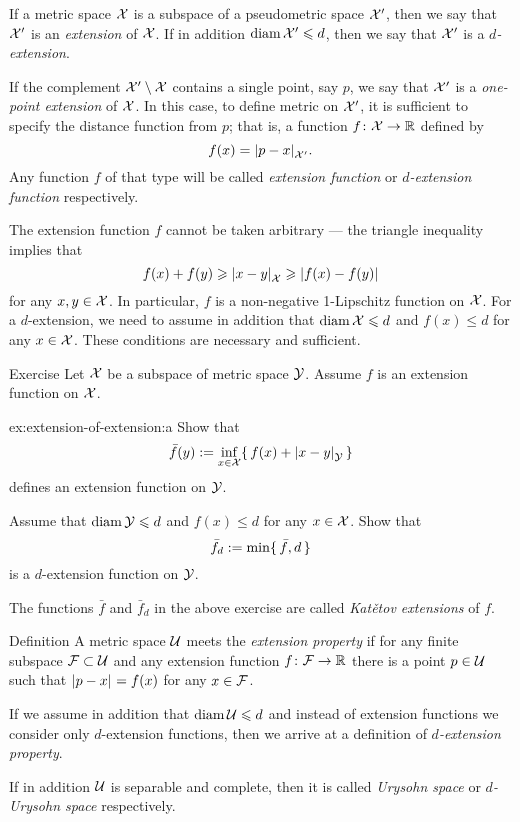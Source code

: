 If a metric space $\mathcal{X}$ is a subspace of a pseudometric space $\mathcal{X}'$, then we say that $\mathcal{X}'$ is an \emph{extension} of $\mathcal{X}$.
If in addition $\operatorname{\rm diam}\nolimits\mathcal{X}'\leqslant d$, then we say that $\mathcal{X}'$ is a {}\emph{$d$-extension}. %

If the complement $\mathcal{X}'\setminus \mathcal{X}$ contains a single point, say $p$, we say that $\mathcal{X}'$ is a \emph{one-point extension} of $\mathcal{X}$.
In this case, to define metric on $\mathcal{X}'$, it is sufficient to specify the distance function from $p$; that is, a function $f\colon\mathcal{X}\to\mathbb{R}$ defined by 
\[f(x)=\dist{p}{x}{\spc{X}'}.\]
Any function $f$ of that type will be called \emph{extension function}\label{page:extension function} or {}\emph{$d$-extension function} respectively.

The extension function $f$ cannot be taken arbitrary --- the triangle inequality implies that 
\[f(x)+f(y)\ge \dist{x}{y}{\spc{X}}\ge |f(x)-f(y)|\]
for any $x,y\in \mathcal{X}$.
In particular, $f$ is a non-negative 1-Lipschitz function on $\mathcal{X}$.
For a $d$-extension, we need to assume in addition that $\diam\spc{X}\z\le d$ and $f(x)\le d$ for any $x\in \mathcal{X}$.
These conditions are necessary and sufficient.

\begin{thm}{Exercise}\label{ex:extension-of-extension}
Let $\mathcal{X}$ be a subspace of metric space $\mathcal{Y}$.
Assume $f$ is an extension function on $\mathcal{X}$.

\begin{subthm}{ex:extension-of-extension:a}
Show that 
\[\bar f(y)
\df
\inf_{x\in \spc{X}} \{\,f(x)+\dist{x}{y}{\spc{Y}}\,\}\]
defines an extension function on $\mathcal{Y}$.
\end{subthm}

\begin{subthm}{}
Assume that $\operatorname{\rm diam}\nolimits \mathcal{Y}\leqslant d$ and $f(x)\le d$ for any $x\in  \mathcal{X}$.
Show that 
\[\bar f_d
\mathrel{:=}
\min \{\, \bar f,d\,\}\]
is a $d$-extension function on $\mathcal{Y}$.
\end{subthm}

\end{thm}

The functions $\bar f$ and $\bar f_d$ in the above exercise are called \emph{Katětov extensions} of $f$.

\begin{thm}{Definition}\label{def:finite+1}
A metric space $\mathcal{U}$ meets the \emph{extension property}  if for any finite subspace $\mathcal{F}\subset\mathcal{U}$ and any extension function $f\colon\mathcal{F}\to\mathbb{R}$ there is a point $p\in \mathcal{U}$ such that $\dist{p}{x}{}=f(x)$ for any $x\in \mathcal{F}$.

If we assume in addition that $\operatorname{\rm diam}\nolimits \mathcal{U}\leqslant d$ and instead of extension functions we consider only $d$-extension functions, then we arrive at a definition of {}\emph{$d$-extension property}.

If in addition $\mathcal{U}$ is separable and complete, then it is called \emph{Urysohn space} or {}\emph{$d$-Urysohn space} respectively.
\end{thm}


